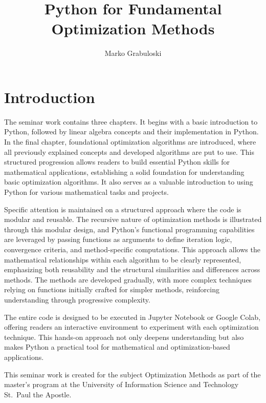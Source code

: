 \documentclass[11pt]{article}
\title{Python for Fundamental Optimization Methods}
\author{Marko Grabuloski}
\begin{document}
    
    \maketitle
    
    

    
    

    \tableofcontents

    \newpage

\section{Introduction}\label{introduction}

The seminar work contains three chapters. It begins with a basic
introduction to Python, followed by linear algebra concepts and their
implementation in Python. In the final chapter, foundational
optimization algorithms are introduced, where all previously explained
concepts and developed algorithms are put to use. This structured
progression allows readers to build essential Python skills for
mathematical applications, establishing a solid foundation for
understanding basic optimization algorithms. It also serves as a
valuable introduction to using Python for various mathematical tasks and
projects.

Specific attention is maintained on a structured approach where the code
is modular and reusable. The recursive nature of optimization methods is
illustrated through this modular design, and Python's functional
programming capabilities are leveraged by passing functions as arguments
to define iteration logic, convergence criteria, and method-specific
computations. This approach allows the mathematical relationships within
each algorithm to be clearly represented, emphasizing both reusability
and the structural similarities and differences across methods. The
methods are developed gradually, with more complex techniques relying on
functions initially crafted for simpler methods, reinforcing
understanding through progressive complexity.

The entire code is designed to be executed in Jupyter Notebook or Google
Colab, offering readers an interactive environment to experiment with
each optimization technique. This hands-on approach not only deepens
understanding but also makes Python a practical tool for mathematical
and optimization-based applications.

This seminar work is created for the subject Optimization Methods as
part of the master's program at the University of Information Science
and Technology St.~Paul the Apostle.
\end{document}
